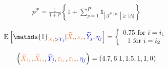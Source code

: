\documentclass[12pt]{article}
\theoremstyle{definition}
\newcommand{\darkblue}{blue!80!black}
\begin{document}
\begin{align*}
	p^{\mathcal{P}} = \frac{1}{1+P} \left\{1+\sum_{p=1}^P \mathds{1}_{\left| \Delta^{\mathcal{P}(p)}\right| \geq \left|\Delta \right|} \right\}
\end{align*}

\begin{align*}	\mathbb{E}\left[\mathds{1}_{\textcolor{Orange}{X_{i}}>\textcolor{\darkblue}{Y_{j}}}|\textcolor{Orange}{\widetilde{X}_{i}},\textcolor{Orange}{\varepsilon_i},\textcolor{\darkblue}{\widetilde{Y}_{j}},\textcolor{\darkblue}{\eta_j}\right] = \left\{\begin{array}{c}
		0.75 \text{ for } i=i_1 \\
		1 \text{ for } i=i_2
	\end{array}\right.
\end{align*}

\begin{align*}
\left(
\textcolor{Orange}{\widetilde{X}_{i_1}},
\textcolor{Orange}{\widetilde{X}_{i_2}},
\textcolor{\darkblue}{\widetilde{Y}_{j}},
\textcolor{Orange}{\varepsilon_{i_1}},
\textcolor{Orange}{\varepsilon_{i_2}},
\textcolor{\darkblue}{\eta_{j}}
\right) = (4.7,6.1,1.5,1,1,0)
\end{align*}
\end{document}
